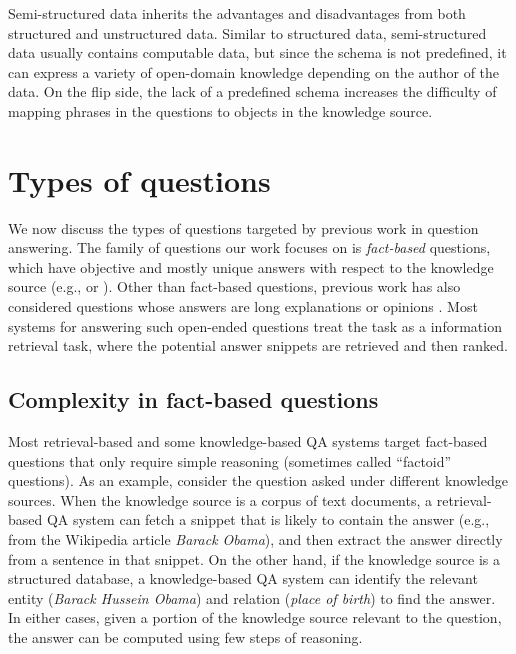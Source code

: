 Semi-structured data inherits the advantages and disadvantages
from both structured and unstructured data.
Similar to structured data,
semi-structured data usually contains computable data,
but since the schema is not predefined,
it can express a variety of open-domain knowledge
depending on the author of the data.
On the flip side, the lack of a predefined schema
increases the difficulty of mapping
phrases in the questions to objects in the knowledge source.

\section{Types of questions}
\label{sec:rw-questions}

We now discuss the types of questions targeted by previous work
in question answering.
The family of questions our work focuses on is \emph{fact-based}
questions,
which have objective and mostly unique answers
with respect to the knowledge source
(e.g., 
or ).
%
Other than fact-based questions,
previous work has also considered questions
whose answers are long explanations or opinions
\cite{burke1997question,soricut2006automatic}.
Most systems for answering such open-ended questions
treat the task as a information retrieval task,
where the potential answer snippets are retrieved and then ranked.

\subsection{Complexity in fact-based questions}

Most retrieval-based and some knowledge-based QA systems
target fact-based questions that only require simple reasoning
(sometimes called ``factoid'' questions).
As an example, consider the question
asked under different knowledge sources.
When the knowledge source is a corpus of text documents,
a retrieval-based QA system can fetch a snippet that is likely
to contain the answer
(e.g.,  from
the Wikipedia article \emph{Barack Obama}),
and then extract the answer
 directly from a sentence in that snippet.
On the other hand, if the knowledge source is a structured database,
a knowledge-based QA system can identify the relevant entity
(\emph{Barack Hussein Obama})
and relation
(\emph{place of birth})
to find the answer.
In either cases,
given a portion of the knowledge source relevant to the question,
the answer can be computed using few steps of reasoning.

